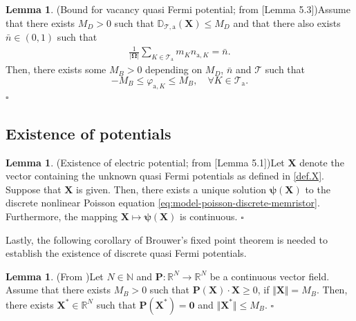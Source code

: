 \documentclass[10pt,a4paper, final]{article}
\def\ions{\text{a}}
\newcommand*{\QEDB}{\null\nobreak\hfill\ensuremath{\square}}%
\theoremstyle{definition}								%
\newtheorem{lemma}[theorem]{Lemma}					%
\numberwithin{equation}{section}
\numberwithin{figure}{section}
\numberwithin{theorem}{section}
\begin{document}

\begin{lemma}(Bound for vacancy quasi Fermi potential; from \cite{Abdel2023Existence}[Lemma 5.3])\label{lem.bounds.anions}
    Assume that there exists $M_{D}>0$ such that ${\mathbb D}_{\mathcal{T},\ions}(\mathbf{X})\leq M_{D}$ and that there also exists ${\bar n}\in (0,1)$ such that
    \begin{align}  \label{eq:lem.mass-conserv-a}
        \frac{1}{| \mathbf{\Omega}|}\sum_{K\in\mathcal{T}_{ \ions }}m_K n_{\ions, K}={\bar n}.
    \end{align}
    Then, there exists some $ M_B >0$ depending on $M_{D}$, ${\bar n}$ and $\mathcal{T}$ such that
    \begin{equation}\label{bounds.phia}
        - M_B \leq \varphi_{\ions,K}\leq M_B, \quad \forall K\in\mathcal{T}_{\ions}.
    \end{equation}
    \QEDB
\end{lemma}


\subsection{Existence of potentials}

\begin{lemma}(Existence of electric potential; from \cite{Abdel2023Existence}[Lemma 5.1])\label{lem:discrete-poisson}
    Let $\mathbf{X}$ denote the vector containing the unknown quasi Fermi potentials as defined in \eqref{def.X}.
    Suppose that $\mathbf{X}$ is given.
    Then, there exists a unique solution $\boldsymbol{\psi}(\mathbf{X})$ to the discrete nonlinear Poisson equation \eqref{eq:model-poisson-discrete-memristor}.
    Furthermore, the mapping $\mathbf{X} \mapsto \boldsymbol{\psi}(\mathbf{X})$ is continuous.
    \QEDB
\end{lemma}

Lastly, the following corollary of Brouwer's fixed point theorem is needed to establish the existence of discrete quasi Fermi potentials.

\begin{lemma}(From \cite[Section 9.1]{Evans.2010})\label{lem.Evans}
    Let $N\in\mathbb{N} $ and $\mathbf{P}: \mathbb{R}^N\to \mathbb{R}^N$ be a continuous vector field. Assume that there exists $M_B > 0$ such that $\mathbf{P}(\mathbf{X})\cdot \mathbf{X} \geq 0$, if $\Vert \mathbf{X}\Vert = M_B $. Then, there exists $\mathbf{X}^{\ast}\in\mathbb{R}^N$ such that $\mathbf{P}(\mathbf{X}^{\ast})=\mathbf{0}$ and $\Vert \mathbf{X}^{\ast}\Vert \leq M_B$. \QEDB
\end{lemma}




\end{document}
